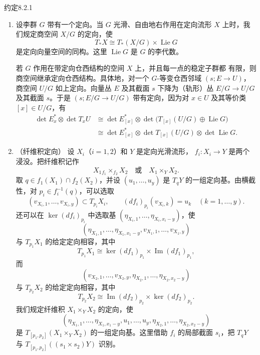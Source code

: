 \begin{statement}{约定}{8.2.1}
\begin{enumerate}[label=(\arabic*),leftmargin=2.8em]
设 $(s;E\to U)$ 是带边定向仓西结构空间的一个局部坐标图。回忆
$(s;E\to U)$ 的定向就是 $\det E^*\otimes\det TU$ 的定向。
必要时缩小 $U$，便可假定 $U$ 是带边定向流形，而 $E$ 是其上的
定向向量丛。我们把 $(s;E\to U)$ 的边界定向定义为
\[
 \partial(s;E\longrightarrow U)
 =(-1)^{\operatorname{rank}E}
 \bigl(s|_{\partial U};E|_{\partial U}\longrightarrow\partial U\bigr),
\]
其中 $\partial U$ 带有 $U$ 的边界定向。

\item 设李群 $G$ 带有一个定向。当 $G$ 光滑、自由地右作用在定向流形
$X$ 上时，我们规定商空间 $X/G$ 的定向，使
\begin{equation}
 T_*X\cong T_*(X/G)\times\operatorname{Lie}G
 \tag{8.2.1.2}\label{eq:8-2-1-2}
\end{equation}
是定向向量空间的同构。这里 $\operatorname{Lie}G$ 是 $G$ 的李代数。

若 $G$ 作用在带定向仓西结构的空间 $X$ 上，并且每一点的稳定子群都
有限，则商空间继承定向仓西结构。具体地，对一个 $G$-等变仓西邻域
$(s;E\to U)$，商空间 $U/G$ 如上定向。向量丛 $E$ 及其截面 $s$
下降为（轨形）丛 $E/G\to U/G$ 及其截面 $s$。于是
$(s;E/G\to U/G)$ 带有定向，因为对 $x\in U$ 及其等价类
$[x]\in U/G$，有
\[
\begin{aligned}
 \det E_x^*\otimes\det T_xU
 &\cong \det E_{[x]}^*\otimes
   \det\bigl(T_{[x]}(U/G)\oplus\operatorname{Lie}G\bigr)\\
 &\cong \det E_{[x]}^*\otimes\det T_{[x]}(U/G)
   \otimes\det\operatorname{Lie}G.
\end{aligned}
\]

\item \textup{（纤维积定向）}
设 $X_i$（$i=1,2$）和 $Y$ 是定向光滑流形，
$f_i\colon X_i\to Y$ 是两个浸没。把纤维积记作
\[
 X_1{}_{f_1}\!\times_{f_2}X_2
 \quad\text{或}\quad X_1\times_YX_2.
\]
取 $q\in f_1(X_1)\cap f_2(X_2)$，并设
$(u_1,\ldots,u_y)$ 是 $T_qY$ 的一组定向基。由横截性，对
$p_i\in f_i^{-1}(q)$，可以选取
\[
 (v_{X_i,1},\ldots,v_{X_i,y})\subset T_{p_i}X_i,
 \qquad
 (df_i)_{p_i}(v_{X_i,k})=u_k
 \quad(k=1,\ldots,y).
\]
还可以在 $\ker(df_i)_{p_i}$ 中选取基
$(\eta_{X_i,1},\ldots,\eta_{X_i,x_i-y})$，使
\[
 (\eta_{X_1,1},\ldots,\eta_{X_1,x_1-y},
   v_{X_1,1},\ldots,v_{X_1,y})
\]
与 $T_{p_1}X_1$ 的给定定向相容，其中
\[
 T_{p_1}X_1\cong
 \ker(df_1)_{p_1}\times\operatorname{Im}(df_1)_{p_1},
\]
而
\[
 (v_{X_2,1},\ldots,v_{X_2,y},
   \eta_{X_2,1},\ldots,\eta_{X_2,x_2-y})
\]
与 $T_{p_2}X_2$ 的给定定向相容，其中
\[
 T_{p_2}X_2\cong
 \operatorname{Im}(df_2)_{p_2}\times\ker(df_2)_{p_2}.
\]
我们规定纤维积 $X_1\times_YX_2$ 的定向，使
\[
 (\eta_{X_1,1},\ldots,\eta_{X_1,x_1-y},u_1,\ldots,u_y,
   \eta_{X_2,1},\ldots,\eta_{X_2,x_2-y})
\]
是 $T_{[p_1,p_2]}(X_1\times_YX_2)$ 的一组定向基。这里借助
$f_i$ 的局部截面 $s_i$，把 $T_qY$ 与
$T_{[p_1,p_2]}((s_1\times s_2)Y)$ 识别。


\end{enumerate}
\end{statement}
